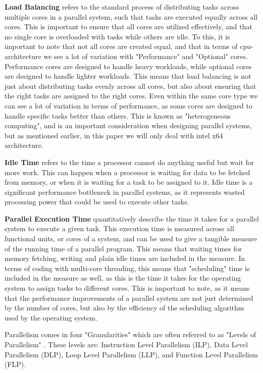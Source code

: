 \documentclass[12pt,a4paper]{article}
\begin{document}
\textbf{Load Balancing} refers to the standard process of distributing tasks across multiple cores in a parallel system, such that tasks are executed equally across all cores. This is important to ensure that all cores are utilized effectively, and that no single core is overloaded with tasks while others are idle. To this, it is important to note that not all cores are created equal, and that in terms of cpu-architecture we see a lot of variation with "Performance" and "Optional" cores. Performance cores are designed to handle heavy workloads, while optional cores are designed to handle lighter workloads. This means that load balancing is not just about distributing tasks evenly across all cores, but also about ensuring that the right tasks are assigned to the right cores. Even within the same core type we can see a lot of variation in terms of performance, as some cores are designed to handle specific tasks better than others. This is known as "heterogeneous computing", and is an important consideration when designing parallel systems, but as mentioned earlier, in this paper we will only deal with intel x64 architecture.

\textbf{Idle Time} refers to the time a processor cannot do anything useful but wait for more work. This can happen when a processor is waiting for data to be fetched from memory, or when it is waiting for a task to be assigned to it. Idle time is a significant performance bottleneck in parallel systems, as it represents wasted processing power that could be used to execute other tasks.

\textbf{Parallel Execution Time} quantitatively describe the time it takes for a parallel system to execute a given task. This execution time is measured across all functional units, or cores of a system, and can be used to give a tangible measure of the running time of a parallel program. This means that waiting times for memory fetching, writing and plain idle times are included in the measure. In terms of coding with multi-core threading, this means that "scheduling" time is included in the measure as well, as this is the time it takes for the operating system to assign tasks to different cores. This is important to note, as it means that the performance improvements of a parallel system are not just determined by the number of cores, but also by the efficiency of the scheduling algorithm used by the operating system.

Parallelism comes in four "Granularities"\parencite[p. 4]{Rauber2023} which are often referred to as "Levels of Parallelism" \parencite[pp. 114-125]{Rauber2023}. These levels are: Instruction Level Parallelism (ILP), Data Level Parallelism (DLP), Loop Level Parallelism (LLP), and Function Level Parallelism (FLP).
\end{document}
